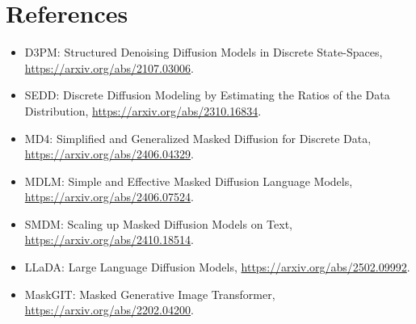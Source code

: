 \documentclass[11pt]{article}
\begin{document}
\section{References}

\begin{itemize}[leftmargin=*]
\item D3PM: Structured Denoising Diffusion Models in Discrete State-Spaces,
  \url{https://arxiv.org/abs/2107.03006}.
\item SEDD: Discrete Diffusion Modeling by Estimating the Ratios of the Data
  Distribution, \url{https://arxiv.org/abs/2310.16834}.
\item MD4: Simplified and Generalized Masked Diffusion for Discrete Data,
  \url{https://arxiv.org/abs/2406.04329}.
\item MDLM: Simple and Effective Masked Diffusion Language Models,
  \url{https://arxiv.org/abs/2406.07524}.
\item SMDM: Scaling up Masked Diffusion Models on Text,
  \url{https://arxiv.org/abs/2410.18514}.
\item LLaDA: Large Language Diffusion Models,
  \url{https://arxiv.org/abs/2502.09992}.
\item MaskGIT: Masked Generative Image Transformer,
  \url{https://arxiv.org/abs/2202.04200}.
\end{itemize}
\end{document}
